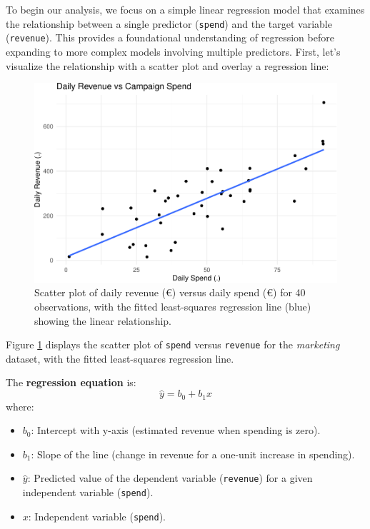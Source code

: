 \documentclass[
]{book}
\newcommand{\passthrough}[1]{#1}
\providecommand{\tightlist}{%
  \setlength{\itemsep}{0pt}\setlength{\parskip}{0pt}}
\theoremstyle{definition}
\theoremstyle{definition}
\theoremstyle{definition}
\theoremstyle{definition}
\theoremstyle{remark}
\begin{document}
To begin our analysis, we focus on a simple linear regression model that examines the relationship between a single predictor (\passthrough{\lstinline!spend!}) and the target variable (\passthrough{\lstinline!revenue!}). This provides a foundational understanding of regression before expanding to more complex models involving multiple predictors. First, let's visualize the relationship with a scatter plot and overlay a regression line:

\begin{figure}

{\centering \includegraphics[width=0.8\linewidth]{regression_files/figure-latex/scoter-plot-simple-reg-1} 

}

\caption{Scatter plot of daily revenue (€) versus daily spend (€) for 40 observations, with the fitted least-squares regression line (blue) showing the linear relationship.}\label{fig:scoter-plot-simple-reg}
\end{figure}

Figure \ref{fig:scoter-plot-simple-reg} displays the scatter plot of \passthrough{\lstinline!spend!} versus \passthrough{\lstinline!revenue!} for the \emph{marketing} dataset, with the fitted least-squares regression line.

The \textbf{regression equation} is:\\
\[
\hat{y} = b_0 + b_1x
\]
where:

\begin{itemize}
\tightlist
\item
  \(b_0\): Intercept with y-axis (estimated revenue when spending is zero).\\
\item
  \(b_1\): Slope of the line (change in revenue for a one-unit increase in spending).\\
\item
  \(\hat{y}\): Predicted value of the dependent variable (\passthrough{\lstinline!revenue!}) for a given independent variable (\passthrough{\lstinline!spend!}).\\
\item
  \(x\): Independent variable (\passthrough{\lstinline!spend!}).
\end{itemize}
\end{document}
